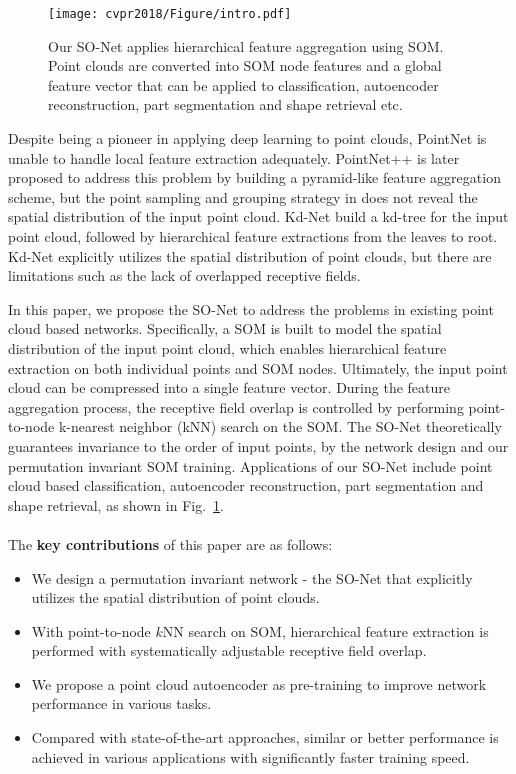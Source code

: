 \documentclass[10pt,twocolumn,letterpaper]{article}
\begin{document}
%
\begin{figure}[t] \centering
\texttt{[image: cvpr2018/Figure/intro.pdf]}
\caption{Our SO-Net applies hierarchical feature aggregation using SOM. Point clouds are converted into SOM node features and a global feature vector that can be applied to classification, autoencoder reconstruction, part segmentation and shape retrieval etc. 
} \label{fig_intro}
\vspace{-4pt}
\end{figure}
%

Despite being a pioneer in applying deep learning to point clouds, PointNet is unable to handle local feature extraction adequately. PointNet++ \cite{qi2017pointnet++} is later proposed to address this problem by building a pyramid-like feature aggregation scheme, but the point sampling and grouping strategy in \cite{qi2017pointnet++} does not reveal the spatial distribution of the input point cloud. Kd-Net \cite{klokov2017escape} build a kd-tree for the input point cloud, followed by hierarchical feature extractions from the leaves to root. Kd-Net explicitly utilizes the spatial distribution of point clouds, but there are limitations such as the lack of overlapped receptive fields.

In this paper, we propose the SO-Net to address the problems in existing point cloud based networks. Specifically, a SOM \cite{kohonen1998self} is built to model the spatial distribution of the input point cloud, which enables hierarchical feature extraction on both individual points and SOM nodes. Ultimately, the input point cloud can be compressed into a single feature vector. During the feature aggregation process, the receptive field overlap is controlled by performing point-to-node k-nearest neighbor (kNN) search on the SOM. The SO-Net theoretically guarantees invariance to the order of input points, by the network design and our permutation invariant SOM training. Applications of our SO-Net include point cloud based classification, autoencoder reconstruction, part segmentation and shape retrieval, as shown in Fig.~\ref{fig_intro}.
\\\\
\noindent The \textbf{key contributions} of this paper are as follows:
\begin{itemize}
    \item We design a permutation invariant network - the SO-Net that explicitly utilizes the spatial distribution of point clouds. 
    \item With point-to-node $k$NN search on SOM, hierarchical feature extraction is performed with systematically adjustable receptive field overlap.
    \item We propose a point cloud autoencoder as pre-training to improve network performance in various tasks.
    \item Compared with state-of-the-art approaches, similar or better performance is achieved in various applications with significantly faster training speed.
\end{itemize}
\end{document}
